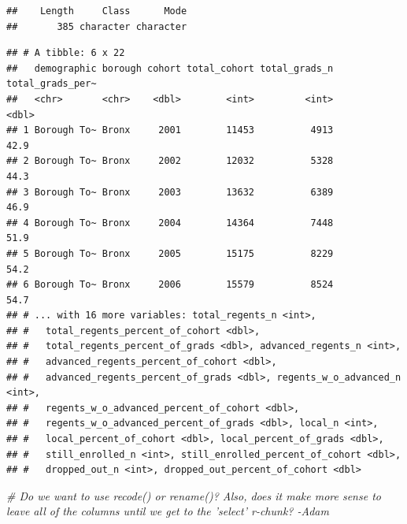 \documentclass[
  english,
  man, fleqn, noextraspace]{apa6}
\newenvironment{Shaded}{\begin{snugshade}}{\end{snugshade}}
\newcommand{\CommentTok}[1]{\textcolor[rgb]{0.56,0.35,0.01}{\textit{#1}}}
\newcommand{\KeywordTok}[1]{\textcolor[rgb]{0.13,0.29,0.53}{\textbf{#1}}}
\newcommand{\NormalTok}[1]{#1}
\newcommand{\OperatorTok}[1]{\textcolor[rgb]{0.81,0.36,0.00}{\textbf{#1}}}
\newcommand{\StringTok}[1]{\textcolor[rgb]{0.31,0.60,0.02}{#1}}
\begin{document}
\begin{verbatim}
##    Length     Class      Mode 
##       385 character character
\end{verbatim}

\begin{Shaded}
\end{Shaded}

\begin{verbatim}
## # A tibble: 6 x 22
##   demographic borough cohort total_cohort total_grads_n total_grads_per~
##   <chr>       <chr>    <dbl>        <int>         <int>            <dbl>
## 1 Borough To~ Bronx     2001        11453          4913             42.9
## 2 Borough To~ Bronx     2002        12032          5328             44.3
## 3 Borough To~ Bronx     2003        13632          6389             46.9
## 4 Borough To~ Bronx     2004        14364          7448             51.9
## 5 Borough To~ Bronx     2005        15175          8229             54.2
## 6 Borough To~ Bronx     2006        15579          8524             54.7
## # ... with 16 more variables: total_regents_n <int>,
## #   total_regents_percent_of_cohort <dbl>,
## #   total_regents_percent_of_grads <dbl>, advanced_regents_n <int>,
## #   advanced_regents_percent_of_cohort <dbl>,
## #   advanced_regents_percent_of_grads <dbl>, regents_w_o_advanced_n <int>,
## #   regents_w_o_advanced_percent_of_cohort <dbl>,
## #   regents_w_o_advanced_percent_of_grads <dbl>, local_n <int>,
## #   local_percent_of_cohort <dbl>, local_percent_of_grads <dbl>,
## #   still_enrolled_n <int>, still_enrolled_percent_of_cohort <dbl>,
## #   dropped_out_n <int>, dropped_out_percent_of_cohort <dbl>
\end{verbatim}

\begin{Shaded}
\begin{Highlighting}[]
\CommentTok{# Do we want to use recode() or rename()? Also, does it make more sense to leave all of the columns until we get to the 'select' r-chunk? -Adam}
\end{Highlighting}
\end{Shaded}
\end{document}
